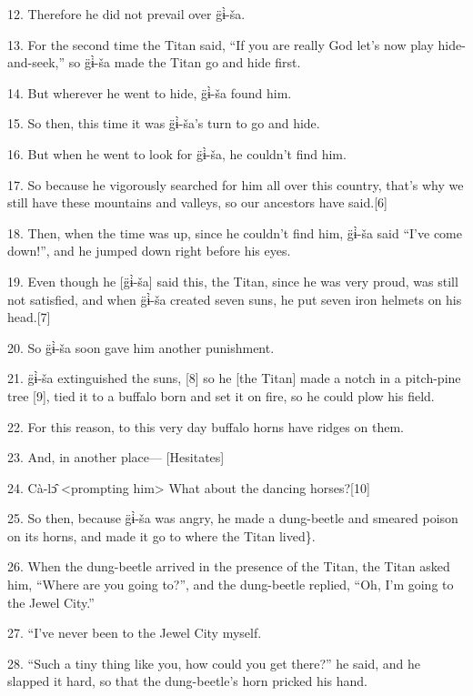 {\LARGE{}12. Therefore he did not prevail over g̈ɨ̀-ša.}

{\LARGE{}13. For the second time the Titan said, ``If you are really God let's
now play hide-and-seek,'' so g̈ɨ̀-ša made the Titan go and hide first.}

{\LARGE{}14. But wherever he went to hide, g̈ɨ̀-ša found him.}

{\LARGE{}15. So then, this time it was g̈ɨ̀-ša's turn to go and hide.}

{\LARGE{}16. But when he went to look for g̈ɨ̀-ša, he couldn't find him.}

{\LARGE{}17. So because he  vigorously searched for him all over this country,
that's why we still have these mountains and valleys, so our ancestors have said.[6]}

{\LARGE{}18. Then, when the time was up, since he couldn't find him, g̈ɨ̀-ša
said ``I've come down!'', and he jumped down right before his eyes.}

{\LARGE{}19. Even though he [g̈ɨ̀-ša] said this, the Titan, since he was very
proud, was still not satisfied, and when g̈ɨ̀-ša created seven suns, he put
seven iron helmets on his head.[7]}

{\LARGE{}20. So g̈ɨ̀-ša soon gave him another punishment.}

{\LARGE{}21. g̈ɨ̀-ša extinguished the suns, [8] so he [the Titan] made a notch
in a pitch-pine tree [9], tied it to a buffalo born and set it on fire, so he could
plow his field.}

{\LARGE{}22. For this reason, to this very day buffalo horns have ridges on them.}

{\LARGE{}23. And, in another place--- [Hesitates]}

{\LARGE{}24. Cà-lɔ̂ <prompting him> What about the dancing
horses?[10]}

{\LARGE{}25. So then, because g̈ɨ̀-ša was angry, he made a dung-beetle and
smeared poison on its horns, and made it go to where the Titan lived\}.}

{\LARGE{}26. When the dung-beetle arrived in the presence of the Titan, the Titan
asked him, ``Where are you going to?'', and the dung-beetle replied, ``Oh, I'm
going to the Jewel City.''}

{\LARGE{}27. ``I've never been to the Jewel City myself.}

{\LARGE{}28. ``Such a tiny thing like you, how could you get there?'' he
said, and he slapped it hard, so that the dung-beetle's horn pricked his hand.}


